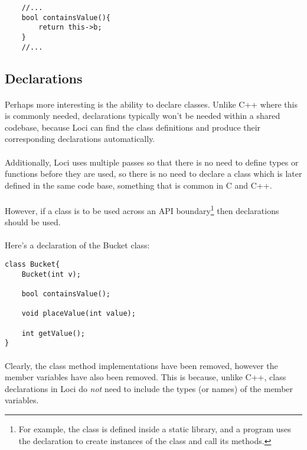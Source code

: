 \documentclass[12pt,twoside,notitlepage]{report}
\begin{document}
\small{
\begin{verbatim}
    //...
    bool containsValue(){
        return this->b;
    }
    //...
\end{verbatim}
}

\subsection{Declarations}

\paragraph{}
Perhaps more interesting is the ability to declare classes. Unlike C++ where this is commonly needed, declarations typically won't be needed within a shared codebase, because Loci can find the class definitions and produce their corresponding declarations automatically.

\paragraph{}
Additionally, Loci uses multiple passes so that there is no need to define types or functions before they are used, so there is no need to declare a class which is later defined in the same code base, something that is common in C and C++.

\paragraph{}
However, if a class is to be used across an API boundary\footnote{For example, the class is defined inside a static library, and a program uses the declaration to create instances of the class and call its methods.} then declarations should be used.

\paragraph{}
Here's a declaration of the Bucket class:

\small{
\begin{verbatim}
class Bucket{
    Bucket(int v);

    bool containsValue();
    
    void placeValue(int value);
    
    int getValue();
}
\end{verbatim}
}

\paragraph{}
Clearly, the class method implementations have been removed, however the member variables have also been removed. This is because, unlike C++, class declarations in Loci do \emph{not} need to include the types (or names) of the member variables.
\end{document}
